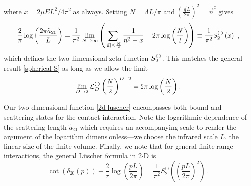 where $x=2\mu EL^2/4\pi^2$ as always.
Setting $N=\Lambda L/\pi$ and $\left(\frac{\vec{q}L}{2\pi}\right)^2=\vec{n}^2$ gives
\begin{equation}
    \frac{2}{\pi} \log \left(\frac{2\pi \tilde a_{20}}{L}\right)
    =
    \frac{1}{\pi^2}
    \lim_{N\to\infty}
    \left(
        \sum_{|\vec{n}|\le \frac{N}{2}} \frac{1}{\vec{n}^2-x}
        -2\pi \log \left(\frac{N}{2}\right)
    \right)
    \equiv
    \frac{1}{\pi^2}S^{\bigcirc}_2\left(x\right)\ ,\label{eq:2d luscher}
\end{equation}
which defines the two-dimensional zeta function $S^{\bigcirc}_2$.
This matches the general result \eqref{spherical S} as long as we allow the limit
\begin{equation}
    \lim_{D\to2}\mathcal{L}_D^\bigcirc \left(\frac{N}{2}\right)^{D-2}=2\pi \log \left(\frac{N}{2}\right).
\end{equation}

Our two-dimensional \Luscher function \eqref{2d luscher} encompasses both bound and scattering states for the contact interaction.
Note the logarithmic dependence of the scattering length $\tilde a_{20}$ which requires an accompanying scale to render the argument of the logarithm dimensionless---we choose the infrared scale $L$, the linear size of the finite volume.
Finally, we note that for general finite-range interactions, the general L\"uscher formula in 2-D is
\begin{equation}\label{eq:full 2d luescher}
\cot(\delta_{20}(p))-\frac{2}{\pi}\log\left(\frac{pL}{2\pi}\right) = \frac{1}{\pi^2}S^\bigcirc_2\left(\left(\frac{pL}{2\pi}\right)^2\right)\ .
\end{equation}
